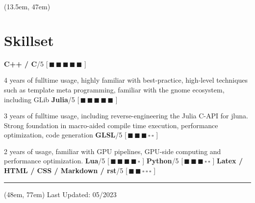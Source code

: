 \documentclass[20pt]{article}
\begin{document}
    \begin{textblock*}{45em}(13.5em, 47em)
        {\section*{\fontsize{15}{15}\selectfont Skillset}}

        \newcommand\skillone[1]{{\noindent \fontsize{14}{14}\selectfont\textbf{#1}}{\hfill\fontsize{13}{13}\selectfont 1/5 \color{swingy_pink}[\color{mint}$\,\blacksquare\,\square\,\square\,\square\,\square$ \color{swingy_pink}]}\newline}
        \newcommand\skilltwo[1]{{\noindent \fontsize{14}{14}\selectfont\textbf{#1}}{\hfill\fontsize{13}{13}\selectfont 2/5 \color{swingy_pink}[\color{mint}$\,\blacksquare\,\blacksquare\,\square\,\square\,\square$ \color{swingy_pink}]}\newline}
        \newcommand\skillthree[1]{{\noindent \fontsize{14}{14}\selectfont\textbf{#1}}{\hfill\fontsize{13}{13}\selectfont 3/5 \color{swingy_pink}[\color{mint}$\,\blacksquare\,\blacksquare\,\blacksquare\,\square\,\square$ \color{swingy_pink}]}\newline}
        \newcommand\skillfour[1]{{\noindent \fontsize{14}{14}\selectfont\textbf{#1}}{\hfill\fontsize{13}{13}\selectfont 4/5 \color{swingy_pink}[\color{mint}$\,\blacksquare\,\blacksquare\,\blacksquare\,\blacksquare\,\square$ \color{swingy_pink}]}\newline}
        \newcommand\skillfive[1]{{\noindent \fontsize{14}{14}\selectfont\textbf{#1}}{\hfill\fontsize{13}{13}\selectfont 5/5 \color{swingy_pink}[\color{mint}$\,\blacksquare\,\blacksquare\,\blacksquare\,\blacksquare\,\blacksquare$ \color{swingy_pink}]}\newline}

        \flushleft
        \fontsize{11}{11}\selectfont

        \skillfive{C++ / C}

        4 years of fulltime usage, highly familiar with best-practice, high-level techniques such as
        template meta programming, familiar with the gnome ecosystem, including GLib
        \newline\linebreak
        \skillfive{Julia}

        3 years of fulltime usage, including reverse-engineering the Julia C-API for jluna. Strong foundation
        in macro-aided compile time execution, performance optimization, code generation
        \newline\linebreak
        \skillthree{GLSL}

        2 years of usage, familiar with GPU pipelines, GPU-side computing and performance optimization.
        \newline\linebreak
        \skillfour{Lua}
        \skillthree{Python}
        \skilltwo{Latex / HTML / CSS / Markdown / rst}
        \vspace{5em}
        {\color{swingy_pink}\rule{\linewidth}{1.5pt}}

    \end{textblock*}

    \begin{textblock*}{\textwidth}(48em, 77em)
        \fontsize{10}{10}\selectfont \color{gray} Last Updated: 05/2023
    \end{textblock*}
\end{document}
